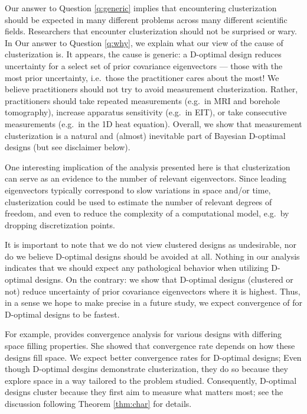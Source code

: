Our answer to Question \ref{q:generic} implies that encountering
clusterization should be expected in many different problems across
many different scientific fields. Researchers that encounter
clusterization should not be surprised or wary. In Our answer to
Question \ref{q:why}, we explain what our view of the cause of
clusterization is. It appears, the cause is generic: a D-optimal
design reduces uncertainty for a select set of prior covariance
eigenvectors --- those with the most prior uncertainty, i.e.~those the
practitioner cares about the most! We believe practitioners should not
try to avoid measurement clusterization. Rather, practitioners should
take repeated measurements (e.g.~in MRI and borehole tomography),
increase apparatus sensitivity (e.g.~in EIT), or take consecutive
measurements (e.g.~in the 1D heat equation). Overall, we show that
measurement clusterization is a natural and (almost) inevitable part
of Bayesian D-optimal designs (but see disclaimer below).

One interesting implication of the analysis presented here is that
clusterization can serve as an evidence to the number of relevant
eigenvectors. Since leading eigenvectors typically correspond to slow
variations in space and/or time, clusterization could be used to
estimate the number of relevant degrees of freedom, and even to reduce
the complexity of a computational model, e.g.~by dropping
discretization points.

It is important to note that we do not view clustered designs as
undesirable, nor do we believe D-optimal designs should be avoided at
all. Nothing in our analysis indicates that we should expect any
pathological behavior when utilizing D-optimal designs. On the
contrary: we show that D-optimal designs (clustered or not) reduce
uncertainty of prior covariance eigenvectors where it is
highest. Thus, in a sense we hope to make precise in a future study,
we expect convergence of for D-optimal designs to be fastest.

For example, \cite{tekentrup2020} provides convergence analysis for
various designs with differing space filling properties. She showed
that convergence rate depends on how these designs fill space. We
expect better convergence rates for D-optimal designs; Even though
D-optimal desgins demonstrate clusterization, they do so because they
explore space in a way tailored to the problem studied. Consequently,
D-optimal designs cluster because they first aim to measure what
matters most; see the discussion following Theorem \ref{thm:char} for
details.



